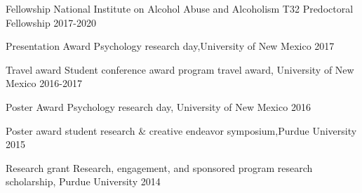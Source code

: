 



\begin{cvhonors}

  \cvhonor
    {Fellowship} %
    {National Institute on Alcohol Abuse and Alcoholism T32 Predoctoral Fellowship} %
    {} %
    {2017-2020} %

  \cvhonor
    {Presentation Award} %
    {Psychology research day,University of New Mexico} %
    {} %
    {2017} %

  \cvhonor
    {Travel award} %
    {Student conference award program travel award, University of New Mexico} %
    {} %
    {2016-2017} %

  \cvhonor
    {Poster Award} %
    {Psychology research day, University of New Mexico} %
    {} %
    {2016} %

  \cvhonor
    {Poster award} %
    {student research \& creative endeavor symposium,Purdue University} %
    {} %
    {2015} %

  \cvhonor
    {Research grant} %
    {Research, engagement, and sponsored program research scholarship, Purdue University} %
    {} %
    {2014} %
\end{cvhonors}




